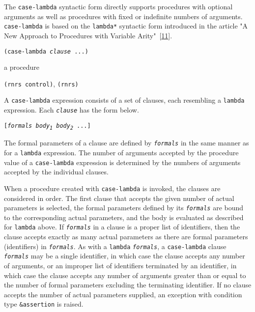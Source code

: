 The \label{binding_s11}\texttt{case-lambda} syntactic form directly supports
procedures with optional arguments as well as procedures with
fixed or indefinite numbers of arguments.
\texttt{case-lambda} is based on
the \label{binding_s12}\texttt{lambda*} syntactic form introduced
in the article "A New Approach to Procedures with Variable
Arity" [\hyperref[bibliography_g229]{11}].

\begin{description}

\label{binding_s13}\item[syntax] \texttt{(case-lambda \textit{clause} ...)}



\item[returns] a procedure


\item[libraries] \texttt{(rnrs control)}, \texttt{(rnrs)}
\end{description}


A \texttt{case-lambda} expression consists of a set of clauses, each
resembling a \texttt{lambda} expression.
Each \texttt{\textit{clause}} has the form below.


\texttt{[\textit{formals} \textit{body\textsubscript{1}} \textit{body\textsubscript{2}} ...]}

The formal parameters of a clause are defined by \texttt{\textit{formals}} in the
same manner as for a \texttt{lambda} expression.
The number of arguments accepted by the procedure value of a
\texttt{case-lambda} expression is
determined by the numbers of arguments accepted by the individual
clauses.


When a procedure created with \texttt{case-lambda} is invoked, the clauses
are considered in order.
The first clause that accepts the given number of actual parameters is
selected, the formal parameters defined by its \texttt{\textit{formals}} are
bound to the corresponding actual parameters, and the body is
evaluated as described for \texttt{lambda} above.
If \texttt{\textit{formals}} in a clause is a proper list of identifiers, then
the clause accepts exactly as many actual parameters as there are
formal parameters (identifiers) in \texttt{\textit{formals}}.
As with a \texttt{lambda} \texttt{\textit{formals}}, a \texttt{case-lambda} clause
\texttt{\textit{formals}}
may be a single identifier, in which case the clause accepts any
number of arguments, or an improper list of identifiers terminated
by an identifier, in which
case the clause accepts any number of arguments greater than or
equal to the number of formal parameters excluding the terminating
identifier.
If no clause accepts the number of actual parameters supplied, an
exception with condition type \texttt{\&{}assertion} is raised.


